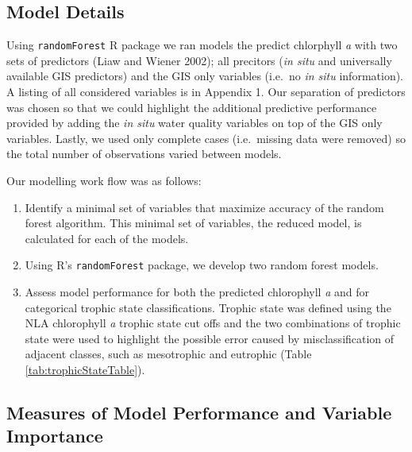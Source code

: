 \documentclass[11pt,]{article}
\begin{document}
\subsection{Model Details}\label{model-details}

Using \texttt{randomForest} R package we ran models the predict
chlorphyll \emph{a} with two sets of predictors (Liaw and Wiener 2002);
all precitors (\emph{in situ} and universally available GIS predictors)
and the GIS only variables (i.e.~no \emph{in situ} information). A
listing of all considered variables is in Appendix 1. Our separation of
predictors was chosen so that we could highlight the additional
predictive performance provided by adding the \emph{in situ} water
quality variables on top of the GIS only variables. Lastly, we used only
complete cases (i.e.~missing data were removed) so the total number of
observations varied between models.

Our modelling work flow was as follows:

\begin{enumerate}
\def\labelenumi{\arabic{enumi}.}
\itemsep1pt\parskip0pt
\item
  Identify a minimal set of variables that maximize accuracy of the
  random forest algorithm. This minimal set of variables, the reduced
  model, is calculated for each of the models.
\item
  Using R's \texttt{randomForest} package, we develop two random forest
  models.
\item
  Assess model performance for both the predicted chlorophyll \emph{a}
  and for categorical trophic state classifications. Trophic state was
  defined using the NLA chlorophyll \emph{a} trophic state cut offs and
  the two combinations of trophic state were used to highlight the
  possible error caused by misclassification of adjacent classes, such
  as mesotrophic and eutrophic (Table \ref{tab:trophicStateTable}).
\end{enumerate}

\subsection{Measures of Model Performance and Variable
Importance}\label{measures-of-model-performance-and-variable-importance}
\end{document}
